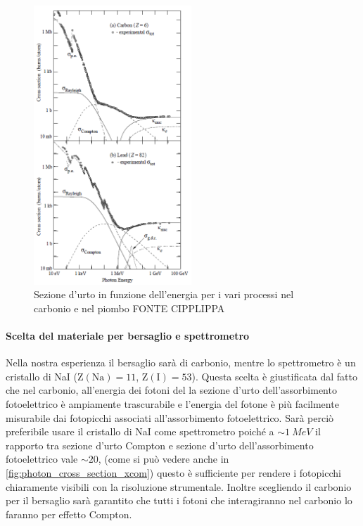   \begin{figure}[h]
 	\centering
 	\includegraphics[width=16em]{cross_section_photon_pdg}
 	\caption{\label{fig:photon_cross_section_pdg}Sezione d'urto in funzione dell'energia per i vari processi nel carbonio e nel piombo FONTE CIPPLIPPA}
 \end{figure}

 \paragraph{Scelta del materiale per bersaglio e spettrometro}
 Nella nostra esperienza il bersaglio sarà di carbonio, mentre lo spettrometro è un cristallo di NaI ($\text{Z}(\text{Na})=11$, $\text{Z}(\text{I})=53$). Questa scelta è giustificata dal fatto che nel carbonio, all'energia dei fotoni del \co\; la sezione d'urto dell'assorbimento fotoelettrico è ampiamente trascurabile e l'energia del fotone è più facilmente misurabile dai fotopicchi associati all'assorbimento fotoelettrico. Sarà perciò preferibile usare il cristallo di NaI come spettrometro poiché a $\sim\SI{1}{MeV}$ il rapporto tra sezione d'urto Compton e sezione d'urto dell'assorbimento fotoelettrico vale $\sim 20$, (come si può vedere anche in \autoref{fig:photon_cross_section_xcom}) questo è sufficiente per rendere i fotopicchi chiaramente visibili con la risoluzione strumentale. Inoltre scegliendo il carbonio per il bersaglio  sarà garantito che tutti i fotoni che interagiranno nel carbonio lo faranno per effetto Compton.
 
